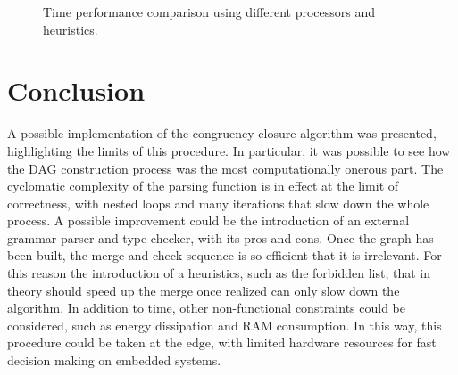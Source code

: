 \documentclass{IEEEtran}
\begin{document}
\begin{figure}[htpb]
\caption{Time performance comparison using different processors and heuristics.}
\label{fig:graph2}
\end{figure}

\section{Conclusion}
A possible implementation of the congruency closure algorithm was presented, highlighting the limits of this procedure. In particular, it was possible to see how the DAG construction process was the most computationally onerous part. The cyclomatic complexity of the parsing function is in effect at the limit of correctness, with nested loops and many iterations that slow down the whole process. A possible improvement could be the introduction of an external grammar parser and type checker, with its pros and cons. Once the graph has been built, the merge and check sequence is so efficient that it is irrelevant. For this reason the introduction of a heuristics, such as the forbidden list, that in theory should speed up the merge once realized can only slow down the algorithm.
In addition to time, other non-functional constraints could be considered, such as energy dissipation and RAM consumption. In this way, this procedure could be taken at the edge, with limited hardware resources for fast decision making on embedded systems.
\end{document}
